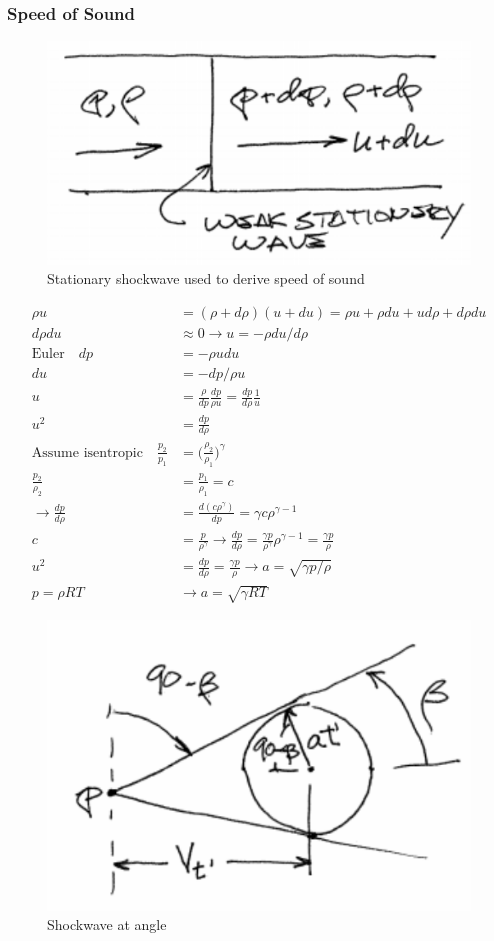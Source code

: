 \documentclass[draft=false, titlepage]{article}
\begin{document}
\subsubsection{Speed of Sound}
\begin{figure}[ht]
	\centering
	\includegraphics[width=0.4\linewidth]{Figures/p45_shockwave.PNG}
	\caption{Stationary shockwave used to derive speed of sound}
	\label{fig:p45_shockwave}
\end{figure}
\begin{align*}
\rho u &= (\rho + d\rho)(u + du) = \rho u + \rho du + u d\rho + d\rho du\\
d\rho du &\approx 0 \rightarrow u = -\rho du/d\rho\\
\text{Euler} \quad dp &= -\rho u du\\
du &= -dp/\rho u\\
u &= \frac{\rho}{dp}\frac{dp}{\rho u} = \frac{dp}{d\rho}\frac{1}{u}\\
u^2 &= \frac{dp}{d\rho}\\
\text{Assume isentropic} \quad \frac{p_2}{p_1} &= \Big(\frac{\rho_2}{\rho_1}\Big)^\gamma\\
\frac{p_2}{\rho_2} &= \frac{p_1}{\rho_1} = c\\
\rightarrow \frac{dp}{d\rho} &= \frac{d(c\rho^\gamma)}{dp} = \gamma c\rho^{\gamma-1}\\
c &= \frac{p}{\rho^\gamma} \rightarrow \frac{dp}{d\rho} = \frac{\gamma p}{\rho^\gamma}\rho^{\gamma-1} = \frac{\gamma p}{\rho}\\
u^2 &= \frac{dp}{d\rho} = \frac{\gamma p}{\rho} \rightarrow a = \sqrt{\gamma p/\rho}\\
p = \rho RT &\rightarrow \boxed{a = \sqrt{\gamma RT}}
\end{align*}

\begin{figure}[ht]
	\centering
	\includegraphics[width=0.4\linewidth]{Figures/p46_shockwave.PNG}
	\caption{Shockwave at angle}
	\label{fig:p46_shockwave}
\end{figure}
\end{document}
